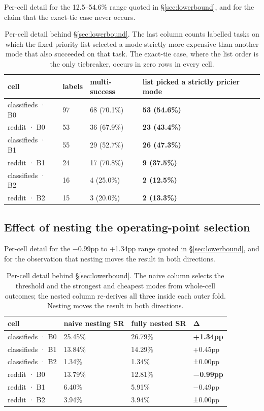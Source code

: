Per-cell detail for the 12.5--54.6\% range quoted in \S\ref{sec:lowerbound}, and for the claim that the exact-tie case never occurs.

\begin{table}[t]
\centering
\caption{Per-cell detail behind \S\ref{sec:lowerbound}. The last column counts labelled tasks on which the fixed priority list selected a mode strictly more expensive than another mode that also succeeded on that task. The exact-tie case, where the list order is the only tiebreaker, occurs in zero rows in every cell.}
\small
\setlength{\tabcolsep}{4pt}
\begin{tabular}{@{}llll@{}}
\toprule
cell & labels & multi-success & list picked a strictly pricier mode \\
\midrule
classifieds · B0 & 97 & 68 (70.1\%) & \textbf{53 (54.6\%)} \\
reddit · B0 & 53 & 36 (67.9\%) & \textbf{23 (43.4\%)} \\
classifieds · B1 & 55 & 29 (52.7\%) & \textbf{26 (47.3\%)} \\
reddit · B1 & 24 & 17 (70.8\%) & \textbf{9 (37.5\%)} \\
classifieds · B2 & 16 & 4 (25.0\%) & \textbf{2 (12.5\%)} \\
reddit · B2 & 15 & 3 (20.0\%) & \textbf{2 (13.3\%)} \\
\bottomrule
\end{tabular}
\end{table}

\subsection{Effect of nesting the operating-point selection}\label{effect-of-nesting-the-operating-point-selection}

Per-cell detail for the −0.99pp to +1.34pp range quoted in \S\ref{sec:lowerbound}, and for the observation that nesting moves the result in both directions.

\begin{table}[t]
\centering
\caption{Per-cell detail behind \S\ref{sec:lowerbound}. The naive column selects the threshold and the strongest and cheapest modes from whole-cell outcomes; the nested column re-derives all three inside each outer fold. Nesting moves the result in both directions.}
\small
\setlength{\tabcolsep}{4pt}
\begin{tabular}{@{}llll@{}}
\toprule
cell & naive nesting SR & fully nested SR & Δ \\
\midrule
classifieds · B0 & 25.45\% & 26.79\% & \textbf{+1.34pp} \\
classifieds · B1 & 13.84\% & 14.29\% & +0.45pp \\
classifieds · B2 & 1.34\% & 1.34\% & ±0.00pp \\
reddit · B0 & 13.79\% & 12.81\% & \textbf{−0.99pp} \\
reddit · B1 & 6.40\% & 5.91\% & −0.49pp \\
reddit · B2 & 3.94\% & 3.94\% & ±0.00pp \\
\bottomrule
\end{tabular}
\end{table}


